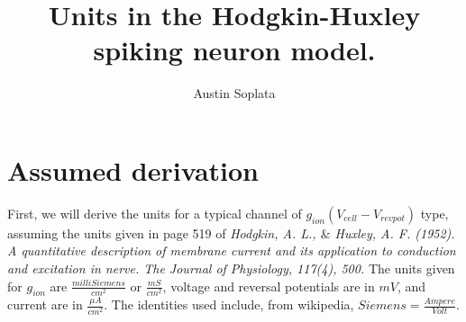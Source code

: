 \documentclass[letterpaper,onecolumn]{article}
\begin{document}
\pagestyle{fancy} %

\title{Units in the Hodgkin-Huxley spiking neuron model.}
\author{Austin Soplata}
\maketitle



\section{Assumed derivation}
\label{sec:1}

\indent\indent First, we will derive the units for a typical channel of $g_{ion}(V_{cell}-V_{rev pot})$ type, assuming the units given in page 519 of {\it Hodgkin, A. L., $\&$ Huxley, A. F. (1952). A quantitative description of membrane current and its application to conduction and excitation in nerve. The Journal of Physiology, 117(4), 500.} 
The units given for $g_{ion}$ are $\frac{milliSiemens}{cm^2}$ or $\frac{mS}{cm^2}$, voltage and reversal potentials are in $mV$, and current are in $\frac{\mu A}{cm^2}$.
The identities used include, from wikipedia, $Siemens = \frac{Ampere}{Volt}$.

% 
\end{document}
